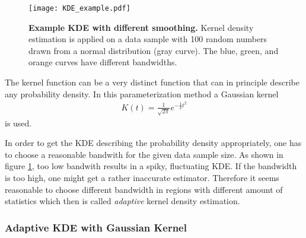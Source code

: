 \begin{figure}[h]
	\centering
	\texttt{[image: KDE\_example.pdf]}
	\caption[Example KDE with different smoothing]{\textbf{Example KDE with different smoothing.} \cite{kde:example_plot} Kernel density estimation is applied on a data sample with 100 random numbers drawn from a normal distribution (gray curve). The blue, green, and orange curves have different bandwidths.}
	\label{kde:example_1d}	
\end{figure}

The kernel function can be a very distinct function that can in principle describe any probability density. In this parameterization method a Gaussian kernel
\begin{align}
	K(t) = \frac{1}{\sqrt{2\pi}}e^{-\frac{1}{2}t^2}
\end{align}
is used.

In order to get the KDE describing the probability density appropriately, one has to choose a reasonable bandwith for the given data sample size. As shown in figure \ref{kde:example_1d}, too low bandwith results in a spiky, fluctuating KDE. If the bandwidth is too high, one might get a rather inaccurate estimator. Therefore it seems reasonable to choose different bandwidth in regions with different amount of statistics which then is called \textit{adaptive} kernel density estimation. \cite{kde:schoenen, kde:wangwang}

\subsubsection{Adaptive KDE with Gaussian Kernel}\label{sec:adaptive_kde}

